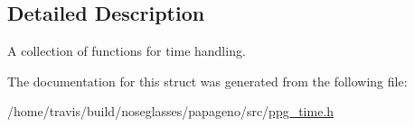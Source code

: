 \subsection{Detailed Description}
A collection of functions for time handling. 

The documentation for this struct was generated from the following file\-:\begin{DoxyCompactItemize}
\item 
/home/travis/build/noseglasses/papageno/src/\hyperlink{ppg__time_8h}{ppg\-\_\-time.\-h}\end{DoxyCompactItemize}
